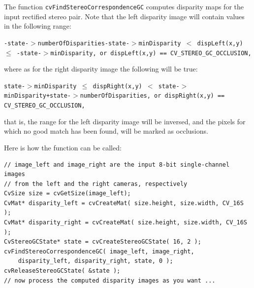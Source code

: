 \begin{description}
\end{description}

The function \texttt{cvFindStereoCorrespondenceGC} computes disparity maps for the input rectified stereo pair. Note that the left disparity image will contain values in the following range: 

\texttt{-state-$>$numberOfDisparities-state-$>$minDisparity 
\newline
$<$ dispLeft(x,y) $≤$ -state-$>$minDisparity,
\newline
or
\newline
dispLeft(x,y) == CV\_STEREO\_GC\_OCCLUSION,}

where as for the right disparity image the following will be true: 

\texttt{state-$>$minDisparity $≤$ dispRight(x,y) 
\newline
$<$ state-$>$minDisparity+state-$>$numberOfDisparities,
\newline
or
\newline
dispRight(x,y) == CV\_STEREO\_GC\_OCCLUSION,}

that is, the range for the left disparity image will be inversed, and the pixels for which no good match has been found, will be marked as occlusions.

Here is how the function can be called:

\begin{lstlisting}
// image_left and image_right are the input 8-bit single-channel images
// from the left and the right cameras, respectively
CvSize size = cvGetSize(image_left);
CvMat* disparity_left = cvCreateMat( size.height, size.width, CV_16S );
CvMat* disparity_right = cvCreateMat( size.height, size.width, CV_16S );
CvStereoGCState* state = cvCreateStereoGCState( 16, 2 );
cvFindStereoCorrespondenceGC( image_left, image_right,
    disparity_left, disparity_right, state, 0 );
cvReleaseStereoGCState( &state );
// now process the computed disparity images as you want ...
\end{lstlisting}

